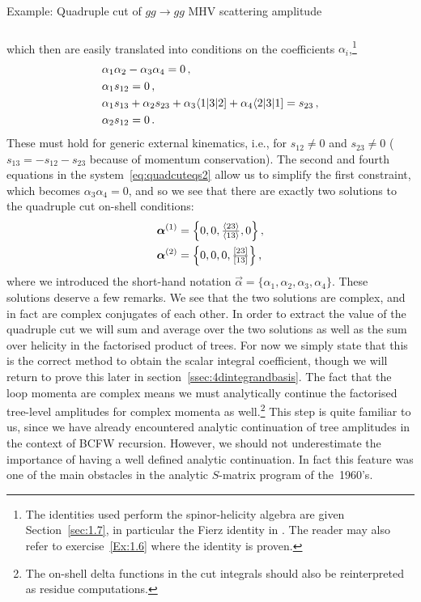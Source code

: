 \begin{example}{Example: Quadruple cut of $gg\to gg$ MHV scattering amplitude}
\begin{align}
\begin{aligned}
  \end{aligned}
  \label{eq:quadcuteqs1}
\end{align}
which then are easily translated into conditions on the coefficients $\alpha_i$,\footnote{The identities used perform the spinor-helicity algebra are given Section~\ref{sec:1.7}, in particular the Fierz identity in . The reader may also refer to exercise~\ref{Ex:1.6} where the identity is proven.}
\begin{align} 
\label{eq:quadcuteqs2}
\begin{aligned}
  &\alpha_1\alpha_2 - \alpha_3\alpha_4 = 0 \,, \\
  &\alpha_1 s_{12} = 0 \,, \\
  &\alpha_1 s_{13} + \alpha_2 s_{23} + \alpha_3 \langle 1 | 3 | 2 ] + \alpha_4 \langle 2 | 3 | 1 ] = s_{23} \,, \\
  &\alpha_2 s_{12} = 0 \,.
 \end{aligned}
\end{align}
These must hold for generic external kinematics, i.e., for $s_{12} \neq 0 $ and $s_{23} \neq 0$ ($s_{13}=-s_{12}-s_{23}$ because of momentum conservation). 
The second and fourth equations in the system~\eqref{eq:quadcuteqs2} allow us to simplify the first constraint, which
becomes $\alpha_3 \alpha_4 = 0$, and so we see that there are exactly two
solutions to the quadruple cut on-shell conditions:
\begin{align}
  \vec{\alpha}^{(1)} &= \Bigl\{ 0, 0, \tfrac{\spA23}{\spA13} , 0 \Bigr\} \,, \\
  \vec{\alpha}^{(2)} &= \Bigl\{ 0, 0, 0, \tfrac{\spB23}{\spB13} \Bigr\} \,,
  \label{eq:quadcutsol}
\end{align}
where we introduced the short-hand notation $\vec{\alpha} = \{\alpha_1,\alpha_2,\alpha_3,\alpha_4\}$.
These solutions deserve a few remarks. We see that the two solutions are
complex, and in fact are complex conjugates of each other. In order to extract
the value of the quadruple cut we will sum and average over the two solutions
as well as the sum over helicity in the factorised product of trees. For now we
simply state that this is the correct method to obtain the scalar integral
coefficient, though we will return to prove this later in
section~\ref{ssec:4dintegrandbasis}. The fact that the loop momenta are complex
means we must analytically continue the factorised tree-level amplitudes for
complex momenta as well.\footnote{The on-shell delta functions in the cut
integrals should also be reinterpreted as residue computations.} This step is
quite familiar to us, since we have already encountered analytic continuation
of tree amplitudes in the context of BCFW recursion. However, we should not
underestimate the importance of having a well defined analytic continuation. In
fact this feature was one of the main obstacles in the analytic $S$-matrix
program of the~1960's.


\end{example}
